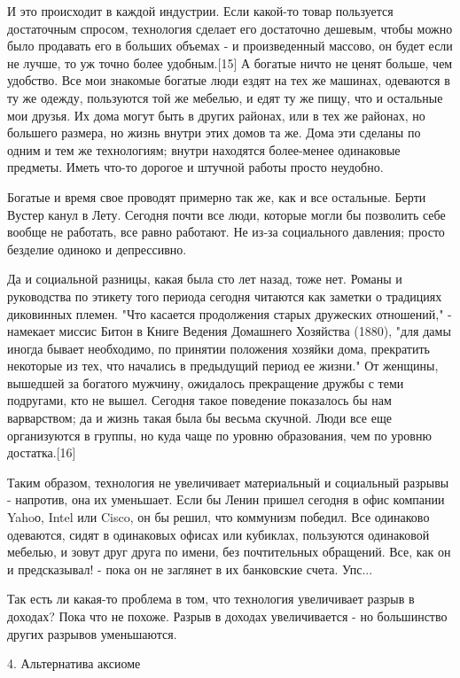\documentclass[ebook,12pt,oneside,openany]{memoir}
\begin{document}
И это происходит в каждой индустрии. Если какой-то товар пользуется
достаточным спросом, технология сделает его достаточно дешевым, чтобы
можно было продавать его в больших объемах - и произведенный массово,
он будет если не лучше, то уж точно более удобным.[15] А богатые ничто
не ценят больше, чем удобство. Все мои знакомые богатые люди ездят на
тех же машинах, одеваются в ту же одежду, пользуются той же мебелью, и
едят ту же пищу, что и остальные мои друзья. Их дома могут быть в
других районах, или в тех же районах, но большего размера, но жизнь
внутри этих домов та же. Дома эти сделаны по одним и тем же
технологиям; внутри находятся более-менее одинаковые предметы. Иметь
что-то дорогое и штучной работы просто неудобно.

Богатые и время свое проводят примерно так же, как и все остальные.
Берти Вустер канул в Лету. Сегодня почти все люди, которые могли бы
позволить себе вообще не работать, все равно работают. Не из-за
социального давления; просто безделие одиноко и депрессивно.

Да и социальной разницы, какая была сто лет назад, тоже нет. Романы и
руководства по этикету того периода сегодня читаются как заметки о
традициях диковинных племен. "Что касается продолжения старых
дружеских отношений," - намекает миссис Битон в Книге Ведения
Домашнего Хозяйства (1880), "для дамы иногда бывает необходимо, по
принятии положения хозяйки дома, прекратить некоторые из тех, что
начались в предыдущий период ее жизни." От женщины, вышедшей за
богатого мужчину, ожидалось прекращение дружбы с теми подругами, кто
не вышел. Сегодня такое поведение показалось бы нам варварством; да и
жизнь такая была бы весьма скучной. Люди все еще организуются в
группы, но куда чаще по уровню образования, чем по уровню
достатка.[16]

Таким образом, технология не увеличивает материальный и социальный
разрывы - напротив, она их уменьшает. Если бы Ленин пришел сегодня в
офис компании Yahoо, Intel или Cisco, он бы решил, что коммунизм
победил. Все одинаково одеваются, сидят в одинаковых офисах или
кубиклах, пользуются одинаковой мебелью, и зовут друг друга по имени,
без почтительных обращений. Все, как он и предсказывал! - пока он не
заглянет в их банковские счета. Упс...

Так есть ли какая-то проблема в том, что технология увеличивает разрыв
в доходах? Пока что не похоже. Разрыв в доходах увеличивается - но
большинство других разрывов уменьшаются.


4. Альтернатива аксиоме
\end{document}
